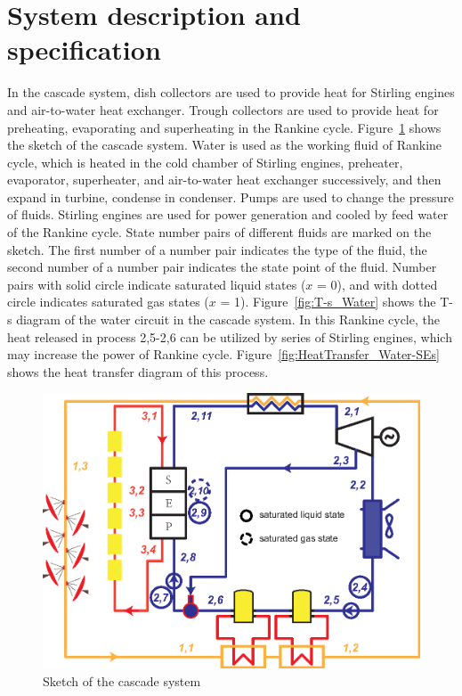 \documentclass{article}
\begin{document}
\section{System description and specification}

In the cascade system, dish collectors are used to provide heat for Stirling engines and air-to-water heat exchanger. Trough collectors are used to provide heat for preheating, evaporating and superheating in the Rankine cycle. Figure~\ref{fig:System-1} shows the sketch of the cascade system. Water is used as the working fluid of Rankine cycle, which is heated in the cold chamber of Stirling engines, preheater, evaporator, superheater, and air-to-water heat exchanger successively, and then expand in turbine, condense in condenser. Pumps are used to change the pressure of fluids. Stirling engines are used for power generation and cooled by feed water of the Rankine cycle. State number pairs of different fluids are marked on the sketch. The first number of a number pair indicates the type of the fluid, the second number of a number pair indicates the state point of the fluid. Number pairs with solid circle indicate saturated liquid states ($x$ = 0), and with dotted circle indicates saturated gas states ($x$ = 1). Figure~\ref{fig:T-s_Water} shows the T-s diagram of the water circuit in the cascade system. In this Rankine cycle, the heat released in process 2,5-2,6 can be utilized by series of Stirling engines, which may increase the power of Rankine cycle. Figure~\ref{fig:HeatTransfer_Water-SEs} shows the heat transfer diagram of this process.

\noindent \begin{figure}[htbp]
\begin{center}
	\includegraphics[width = 0.7\columnwidth]{./graphics/cascadeSystem}
	\caption{Sketch of the cascade system}
	\label{fig:System-1}
\end{center}
\end{figure}
\end{document}
